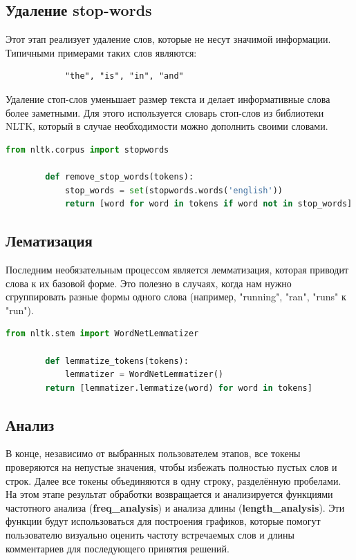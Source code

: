 	\subsection{Удаление stop-words}
		Этот этап реализует удаление слов, которые не несут значимой информации. Типичными примерами таких слов являются:
		\begin{verbatim}
			"the", "is", "in", "and"
		\end{verbatim}
		Удаление стоп-слов уменьшает размер текста и делает информативные слова более заметными. Для этого используется словарь стоп-слов из библиотеки NLTK, который в случае необходимости можно дополнить своими словами.
		\begin{lstlisting}[language=Python]
		from nltk.corpus import stopwords

		def remove_stop_words(tokens):
			stop_words = set(stopwords.words('english'))
			return [word for word in tokens if word not in stop_words]
		\end{lstlisting}

	\subsection{Лематизация}
		Последним необязательным процессом является лемматизация, которая приводит слова к их базовой форме. Это полезно в случаях, когда нам нужно сгруппировать разные формы одного слова (например, "running", "ran", "runs" к "run").

		\begin{lstlisting}[language=Python]
		from nltk.stem import WordNetLemmatizer

		def lemmatize_tokens(tokens):
			lemmatizer = WordNetLemmatizer()
		return [lemmatizer.lemmatize(word) for word in tokens]
		\end{lstlisting}

	
	\subsection{Анализ}
		В конце, независимо от выбранных пользователем этапов, все токены проверяются на непустые значения, чтобы избежать полностью пустых слов и строк. Далее все токены объединяются в одну строку, разделённую пробелами. На этом этапе результат обработки возвращается и анализируется функциями частотного анализа (\textbf{freq\_analysis}) и анализа длины (\textbf{length\_analysis}). Эти функции будут использоваться для построения графиков, которые помогут пользователю визуально оценить частоту встречаемых слов и длины комментариев для последующего принятия решений.
	
